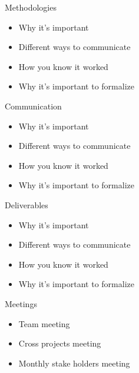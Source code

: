 \documentclass{beamer}
\begin{document}
\begin{frame}{Methodologies}
 \begin{itemize}
  \item
    Why it's important
  \item
    Different ways to communicate
  \item
    How you know it worked
  \item
    Why it's important to formalize
 \end{itemize}
\end{frame}

\begin{frame}{Communication}
 \begin{itemize}
  \item
    Why it's important
  \item
    Different ways to communicate
  \item
    How you know it worked
  \item
    Why it's important to formalize
 \end{itemize}
\end{frame}

\begin{frame}{Deliverables}
 \begin{itemize}
  \item
    Why it's important
  \item
    Different ways to communicate
  \item
    How you know it worked
  \item
    Why it's important to formalize
 \end{itemize}
\end{frame}


\begin{frame}{Meetings}
 \begin{itemize}
  \item
    Team meeting 
  \item
    Cross projects meeting 
  \item
    Monthly stake holders meeting 
 \end{itemize}
\end{frame}



\end{document}
